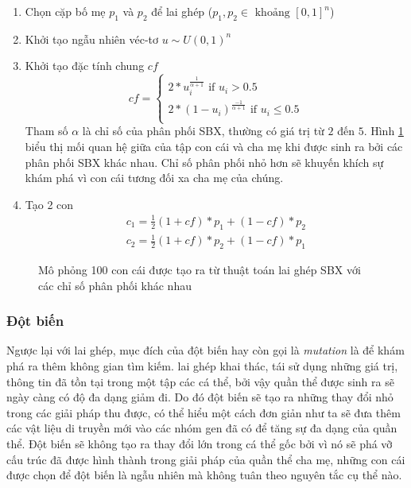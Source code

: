 \begin{enumerate}
\begin{enumerate}
            \item Chọn cặp bố mẹ $p_1$ và $p_2$ để lai ghép ($p_1, p_2 \in \text{ khoảng } [0, 1] ^ n$)
            \item Khởi tạo ngẫu nhiên véc-tơ $u \sim U(0,1)^n$
            \item Khởi tạo đặc tính chung $cf$
                 \[
                    cf=\left\{
                        \begin{array}{ll}
                            2*u_i^{\frac{1}{\alpha + 1}} \text{ if } u_i > 0.5\\
                            2*(1-u_i)^{\frac{-1}{\alpha + 1}} \text{ if } u_i \leq 0.5\\
                        \end{array}
                    \right.
                  \]
                Tham số $\alpha$ là chỉ số của phân phối SBX, thường có giá trị từ $2$ đến $5$. Hình \ref{fig:introduction:sbx} biểu thị mối quan hệ giữa của tập con cái và cha mẹ khi được sinh ra bởi các phân phối SBX khác nhau. Chỉ số phân phối nhỏ hơn sẽ khuyến khích sự khám phá vì con cái tương đối xa cha mẹ của chúng.
            \item Tạo 2 con
                 \[
                     \begin{array}{ll}
                        c_1 = \frac{1}{2} (1 + cf) * p_1 + (1 - cf) * p_2\\
                        c_2 = \frac{1}{2} (1 + cf) * p_2 + (1 - cf) * p_1
                    \end{array}
                  \]
        \end{enumerate}
        \begin{figure}[ht]
            \centering
            \caption{Mô phỏng 100 con cái được tạo ra từ thuật toán lai ghép SBX với các chỉ số phân phối khác nhau}
            \label{fig:introduction:sbx}
        \end{figure}
\end{enumerate}

\subsubsection{Đột biến}
Ngược lại với lai ghép, mục đích của đột biến hay còn gọi là \emph{mutation} là để khám phá ra thêm không gian tìm kiếm. lai ghép khai thác, tái sử dụng những giá trị, thông tin đã tồn tại trong một tập các cá thể, bởi vậy quần thể được sinh ra sẽ ngày càng có độ đa dạng giảm đi. Do đó đột biến sẽ tạo ra những thay đổi nhỏ trong các giải pháp thu được, có thể hiểu một cách đơn giản như ta sẽ đưa thêm các vật liệu di truyền mới vào các nhóm gen đã có để tăng sự đa dạng của quần thể. Đột biến sẽ không tạo ra thay đổi lớn trong cá thể gốc bởi vì nó sẽ phá vỡ cấu trúc đã được hình thành trong giải pháp của quần thể cha mẹ, những con cái được chọn để đột biến là ngẫu nhiên mà không tuân theo nguyên tắc cụ thể nào.

